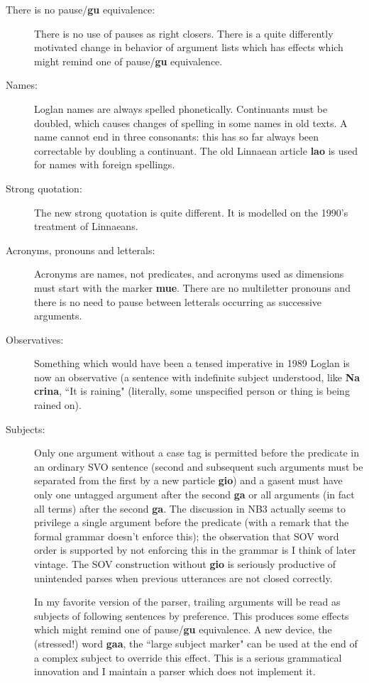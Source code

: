 \documentclass[12pt]{book}
\begin{document}
\begin{description}

\item[There is no pause/{\bf gu} equivalence:]  There is no use of pauses as right closers.  There is a quite differently motivated change in behavior of argument lists which has effects which might remind one of pause/{\bf gu} equivalence.


\item[Names:]  Loglan names are always spelled phonetically.  Continuants must be doubled, which causes changes of spelling in some names in old texts.
A name cannot end in three consonants:  this has so far always been correctable by doubling a continuant.  The old Linnaean article {\bf lao} is used for names with foreign spellings.

\item[Strong quotation:]  The new strong quotation is quite different.   It is modelled on the 1990's treatment of Linnaeans.

\item[Acronyms, pronouns and letterals:]   Acronyms are names, not predicates, and acronyms used as dimensions must start with the marker {\bf mue}.  There are no multiletter pronouns and there is no need to pause between letterals occurring as successive arguments.


\item[Observatives:]   Something which would have been a tensed imperative in 1989 Loglan is now an observative (a sentence with indefinite subject understood, like {\bf Na crina}, ``It is raining" (literally, some unspecified person or thing is being rained on).

\item[Subjects:]  Only one argument without a case tag is permitted before the predicate in an ordinary SVO sentence (second and subsequent such arguments must be separated from the first by a new particle {\bf gio}) and a gasent must have only one untagged argument after the second {\bf ga} or all arguments (in fact all terms) after the second {\bf ga}.  The discussion in NB3 actually seems to privilege a single argument before the predicate (with a remark that the formal grammar doesn't enforce this);  the observation that SOV word order is supported by not enforcing this in the grammar is I think of later vintage.  The SOV construction without {\bf gio} is seriously productive of unintended parses when previous utterances are not closed correctly.

In my favorite version of the parser, trailing arguments will be read as subjects of following sentences by preference.  This produces some effects which might remind one of pause/{\bf gu} equivalence.  A new device,
the (stressed!) word {\bf gaa}, the ``large subject marker" can be used at the end of a complex subject to override this effect.  This is a serious grammatical innovation and I maintain a parser which does not implement it.


\end{description}
\end{document}
